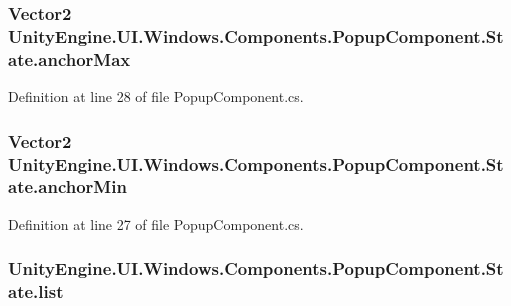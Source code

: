 \subsubsection[{anchor\+Max}]{\setlength{\rightskip}{0pt plus 5cm}Vector2 Unity\+Engine.\+U\+I.\+Windows.\+Components.\+Popup\+Component.\+State.\+anchor\+Max}\label{class_unity_engine_1_1_u_i_1_1_windows_1_1_components_1_1_popup_component_1_1_state_ab854c06e92c1619130d5ae0ee0f9d89e}


Definition at line 28 of file Popup\+Component.\+cs.

\hypertarget{class_unity_engine_1_1_u_i_1_1_windows_1_1_components_1_1_popup_component_1_1_state_a6643c883830739148a721bc1d2eaaee5}{}
\subsubsection[{anchor\+Min}]{\setlength{\rightskip}{0pt plus 5cm}Vector2 Unity\+Engine.\+U\+I.\+Windows.\+Components.\+Popup\+Component.\+State.\+anchor\+Min}\label{class_unity_engine_1_1_u_i_1_1_windows_1_1_components_1_1_popup_component_1_1_state_a6643c883830739148a721bc1d2eaaee5}


Definition at line 27 of file Popup\+Component.\+cs.

\hypertarget{class_unity_engine_1_1_u_i_1_1_windows_1_1_components_1_1_popup_component_1_1_state_a22106fe9140162c4797486e597f839ca}{}
\subsubsection[{list}]{ Unity\+Engine.\+U\+I.\+Windows.\+Components.\+Popup\+Component.\+State.\+list}\label{class_unity_engine_1_1_u_i_1_1_windows_1_1_components_1_1_popup_component_1_1_state_a22106fe9140162c4797486e597f839ca}



